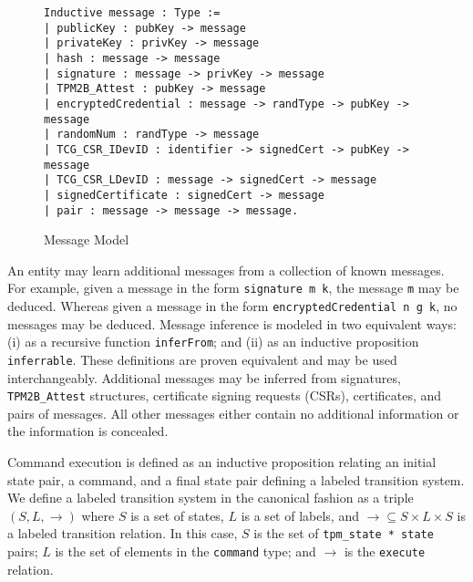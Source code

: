 \documentclass[runningheads]{llncs}
\begin{document}
\begin{figure}[hbtp]
\begin{lstlisting}[language=Coq]
Inductive message : Type :=
| publicKey : pubKey -> message
| privateKey : privKey -> message
| hash : message -> message
| signature : message -> privKey -> message
| TPM2B_Attest : pubKey -> message
| encryptedCredential : message -> randType -> pubKey -> message
| randomNum : randType -> message
| TCG_CSR_IDevID : identifier -> signedCert -> pubKey -> message
| TCG_CSR_LDevID : message -> signedCert -> message
| signedCertificate : signedCert -> message
| pair : message -> message -> message.
\end{lstlisting}
\caption{Message Model}
\label{fig:message-model}
\end{figure}

An entity may learn additional messages from a collection of known
messages. For example, given a message in the form
\verb|signature m k|, the message \verb|m| may be deduced. Whereas
given a message in the form \verb|encryptedCredential n g k|, no
messages may be deduced. Message inference is modeled in two
equivalent ways: (i) as a recursive function \verb|inferFrom|; and
(ii) as an inductive proposition \verb|inferrable|. These definitions
are proven equivalent and may be used interchangeably.  Additional
messages may be inferred from signatures, \verb|TPM2B_Attest|
structures, certificate signing requests (CSRs), certificates, and
pairs of messages. All other messages either contain no additional
information or the information is concealed.

Command execution is defined as an inductive proposition relating an
initial state pair, a command, and a final state pair defining a
labeled transition system. We define a labeled transition system in
the canonical fashion as a triple $(S,L,\rightarrow)$ where $S$ is a
set of states, $L$ is a set of labels, and
$\rightarrow \subseteq S \times L \times S$ is a labeled transition
relation. In this case, $S$ is the set of \verb|tpm_state * state|
pairs; $L$ is the set of elements in the \verb|command| type; and
$\rightarrow$ is the \verb|execute| relation.

\end{document}
